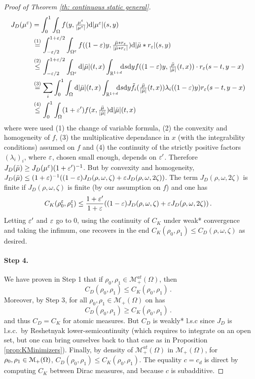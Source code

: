 \begin{proof}[Proof of Theorem \ref{th: continuous static general}]
\begin{align*}
J_D(\mu^{\varepsilon}) 
& =  \int_0^1 \int_{\Omega} f(y, \textstyle{\frac{\mu^{\varepsilon}}{|\mu^{\varepsilon}|}}) \mathrm{d} |\mu^{\varepsilon}|(s,y)  \\
& \overset{(1)}{=}  \int_{-\varepsilon/2}^{1+\varepsilon/2} \int_{\Omega^\varepsilon} f((1-\varepsilon)y, \textstyle{\frac{\bar{\mu} \ast r_{\varepsilon}}{|\bar{\mu} \ast r_{\varepsilon}|}}) \mathrm{d} |\bar{\mu}\ast r_{\varepsilon}|(s,y) \\
& \overset{(2)}{\leq}  \int_{-\varepsilon/2}^{1+\varepsilon/2} \int_{\Omega^\varepsilon} \mathrm{d} |\bar{\mu}|(t,x) \int_{\mathbb{R}^{1+d}} \!\!\! \mathrm{d} s \mathrm{d} y f((1-\varepsilon)y, \textstyle{\frac{\bar{\mu}}{|\bar{\mu}|}}(t,x)) \cdot r_{\varepsilon}(s-t,y-x)  \\
&  \overset{(3)}{=}  \sum_i \int_{0}^{1} \int_{\Omega} \mathrm{d} |\bar{\mu}|(t,x) \int_{\mathbb{R}^{1+d}} \!\!\! \mathrm{d} s \mathrm{d} y \tilde{f}_i(\textstyle{\frac{\bar{\mu}}{|\bar{\mu}|}}(t,x))   \lambda_i((1-\varepsilon)y) r_{\varepsilon}(s-t,y-x)  \\
& \overset{(4)}{\leq} \int_0^{1} \int_{\Omega} (1+\varepsilon')f(x, \textstyle{\frac{\bar{\mu}}{|\bar{\mu}|}})  \mathrm{d} |\bar{\mu}|(t,x) 
\end{align*}
where were used (1) the change of variable formula, (2) the convexity and homogeneity of $f$, (3) the multiplicative dependance in $x$ (with the integrability conditions) assumed on $f$ and (4) the continuity of the strictly positive factors $(\lambda_i)_i$, where $\varepsilon$, chosen small enough, depends on $\varepsilon'$. Therefore $ J_D(\bar{\mu}) \geq J_D(\mu^\varepsilon)(1+\varepsilon')^{-1}$. But by convexity and homogeneity, $J_D(\bar{\mu})\leq (1+\varepsilon)^{-1} ((1-\varepsilon)J_D(\rho,\omega,\zeta) + \varepsilon J_D(\rho,\omega,2\zeta))$. The term $J_D(\rho,\omega,2\zeta)$ is finite if $J_D(\rho,\omega,\zeta)$ is finite (by our assumption on $f$) and one has
\[
C_K(\rho_0^{\varepsilon}, \rho_1^{\varepsilon}) \leq \frac{1+\varepsilon'}{1+\varepsilon}((1-\varepsilon)J_D(\rho,\omega,\zeta) + \varepsilon J_D(\rho,\omega,2\zeta))\, .
\]
%
Letting $\varepsilon'$ and $\varepsilon$ go to $0$, using the continuity of $C_K$ under weak* convergence and taking the infimum, one recovers in the end $C_K(\rho_0,\rho_1) \leq C_D(\rho,\omega,\zeta)$ as desired.

\paragraph{Step 4.}

We have proven in Step 1 that if  $\rho_0, \rho_1 \in \mathcal{M}_+^{at}(\Omega)$, then
\[
C_D(\rho_0, \rho_1) \leq C_K (\rho_0, \rho_1)\, .
\]
Moreover, by Step 3, for all $\rho_0, \rho_1 \in \mathcal{M}_+(\Omega)$ on has
\[
C_D (\rho_0, \rho_1)\geq C_K(\rho_0, \rho_1) \, .
\]
and thus $C_D=C_K$ for atomic measures.  But $C_D$ is weakly* l.s.c since $J_D$ is l.s.c.\ by Reshetnyak lower-semicontinuity (which requires to integrate on an open set, but one can bring ourselves back to that case as in Proposition \ref{prop:KMinimizers}). Finally, by density of $\mathcal{M}_+^{at}(\Omega)$ in $\mathcal{M}_+(\Omega)$, for $\rho_0, \rho_1 \in \mathcal{M}_+(\Omega)$, $C_D(\rho_0, \rho_1)\leq C_K(\rho_0, \rho_1)$. The equality $c=c_d$ is direct by computing $C_K$ between Dirac measures, and because $c$ is subadditive.
\end{proof}
